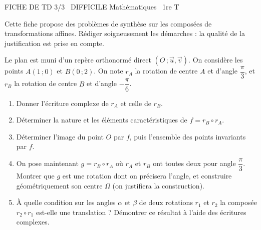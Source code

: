 \documentclass[11pt]{article}
\begin{document}
\begin{tcolorbox}[enhanced,colback=popink,colframe=popink,arc=10pt,boxrule=0pt,left=12pt,right=12pt,top=9pt,bottom=9pt]
{\color{white}\popxbold\small FICHE DE TD 3/3 \textbullet\ DIFFICILE \hfill Mathématiques \textbullet\ 1re T\par}
\end{tcolorbox}
\vspace{4pt}
Cette fiche propose des problèmes de synthèse sur les composées de transformations affines. Rédiger soigneusement les démarches : la qualité de la justification est prise en compte.

\begin{exercice}
Le plan est muni d'un repère orthonormé direct $(O\,;\vec{u},\vec{v})$. On considère les points $A(1\,;0)$ et $B(0\,;2)$. On note $r_A$ la rotation de centre $A$ et d'angle $\dfrac{\pi}{3}$, et $r_B$ la rotation de centre $B$ et d'angle $-\dfrac{\pi}{6}$.
\begin{enumerate}
\item Donner l'écriture complexe de $r_A$ et celle de $r_B$.
\item Déterminer la nature et les éléments caractéristiques de $f = r_B \circ r_A$.
\item Déterminer l'image du point $O$ par $f$, puis l'ensemble des points invariants par $f$.
\item On pose maintenant $g = r_B \circ r_A$ où $r_A$ et $r_B$ ont toutes deux pour angle $\dfrac{\pi}{3}$. Montrer que $g$ est une rotation dont on précisera l'angle, et construire géométriquement son centre $\Omega$ (on justifiera la construction).
\item À quelle condition sur les angles $\alpha$ et $\beta$ de deux rotations $r_1$ et $r_2$ la composée $r_2 \circ r_1$ est-elle une translation ? Démontrer ce résultat à l'aide des écritures complexes.
\end{enumerate}
\end{exercice}
\end{document}
